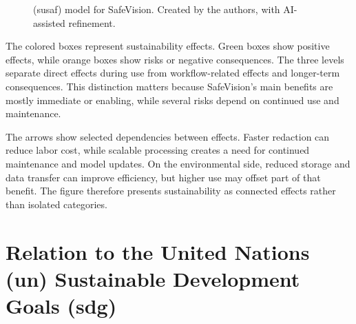 \begin{figure}[H]
{%
}
\caption{(\acrshort{susaf}) model for \gls{SafeVision}. Created by the authors, with AI-assisted refinement.}
\label{fig:susaf-safevision}
\end{figure}


The colored boxes represent sustainability effects. Green boxes show positive effects, while orange boxes show risks or negative consequences. The three levels separate direct effects during use from workflow-related effects and longer-term consequences. This distinction matters because \gls{SafeVision}'s main benefits are mostly immediate or enabling, while several risks depend on continued use and maintenance.

The arrows show selected dependencies between effects. Faster redaction can reduce labor cost, while scalable processing creates a need for continued maintenance and model updates. On the environmental side, reduced storage and data transfer can improve efficiency, but higher use may offset part of that benefit. The figure therefore presents sustainability as connected effects rather than isolated categories.



\section{Relation to the United Nations (\acrshort{un}) Sustainable Development Goals (\acrshort{sdg})}
\label{sec:sdg_relation}

